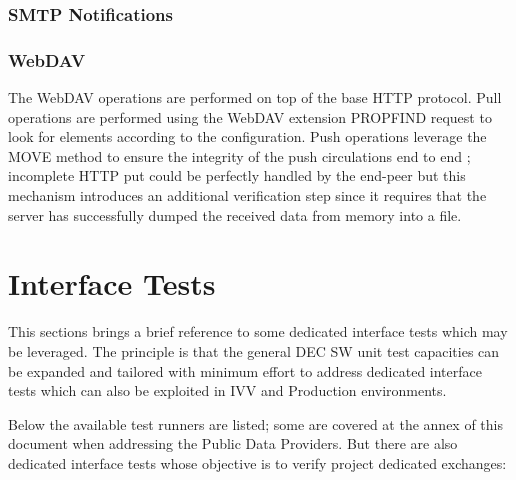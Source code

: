 \documentclass[dec_sum_main.tex]{subfiles}
\begin{document}
 \newline

 \newline

\subsubsection{SMTP Notifications}

\subsubsection{WebDAV}
The WebDAV operations are performed on top of the base HTTP protocol. Pull operations are performed using the WebDAV extension PROPFIND request to look for elements according to the configuration.
Push operations leverage the MOVE method to ensure the integrity of the push circulations end to end ; incomplete HTTP put could be perfectly handled by the end-peer but this mechanism introduces an additional verification step since it requires that the server has successfully dumped the received data from memory into a file. \newline

 \newline

\section{Interface Tests}
This sections brings a brief reference to some dedicated interface tests which may be leveraged. The principle is that the general DEC SW unit test capacities can be expanded and tailored with minimum effort to address dedicated interface tests which can also be exploited in IVV and Production environments. \newline

\par
\noindent
Below the available test runners are listed; some are covered at the annex of this document when addressing the Public Data Providers. But there are also dedicated interface tests whose objective is to verify project dedicated exchanges:
\end{document}

